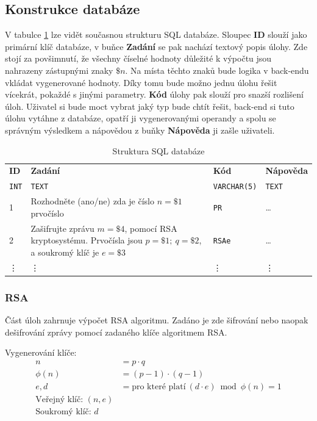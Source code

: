\documentclass[titlepage]{article}
\begin{document}
\subsection{Konstrukce databáze}
V tabulce \ref{tab:struktura_databaze} lze vidět současnou strukturu SQL databáze. Sloupec \textbf{ID} slouží jako primární klíč databáze, v buňce \textbf{Zadání} se pak nachází textový popis úlohy. Zde stojí za povšimnutí, že všechny číselné hodnoty důležité k výpočtu jsou nahrazeny zástupnými znaky $\$n$. Na místa těchto znaků bude logika v back-endu vkládat vygenerované hodnoty. Díky tomu bude možno jednu úlohu řešit vícekrát, pokaždé s jinými parametry. \textbf{Kód} úlohy pak slouží pro snazší rozlišení úloh. Uživatel si bude moct vybrat jaký typ bude chtít řešit, back-end si tuto úlohu vytáhne z databáze, opatří ji vygenerovanými operandy a spolu se správným výsledkem a nápovědou z buňky \textbf{Nápověda} ji zašle uživateli.  
 \begin{table}
    \centering
    \caption{Struktura SQL databáze}
    \label{tab:struktura_databaze}
    \vspace{.5em}
    \begin{tabular}[h]{| l | p{6cm} | l | l |}
        \hline
        \textbf{ID} & \textbf{Zadání} & \textbf{Kód} & \textbf{Nápověda} \\
        \texttt{INT} & \texttt{TEXT} & \texttt{VARCHAR(5)} & \texttt{TEXT} \\
        \hline\hline
        1 & Rozhodněte (ano/ne) zda je číslo $n=\$1$ prvočíslo & \texttt{PR} & \dots \\
        \hline
        2 & Zašifrujte zprávu $m=\$4$, pomocí RSA kryptosystému. Prvočísla jsou $p=\$1;\ q=\$2$, a soukromý klíč je $e=\$3$ & \texttt{RSAe} & \dots\\
        \hline
        \vdots & \vdots & \vdots & \vdots \\
        \hline
    \end{tabular}
 \end{table}
    


\subsubsection{RSA}
Část  úloh zahrnuje výpočet RSA algoritmu. Zadáno je zde šifrování nebo naopak dešifrování zprávy pomocí zadaného klíče algoritmem RSA.

Vygenerování klíče: 
\begin{align*}
     n &= p \cdot q \\
    \phi(n) &= (p-1) \cdot (q-1) \\
    e, d &= \text{pro které platí}\ (d \cdot e) \bmod \phi(n) = 1 \\
    \text{Veřejný klíč: } (n, e) \\
    \text{Soukromý klíč: } d
\end{align*}
\end{document}

